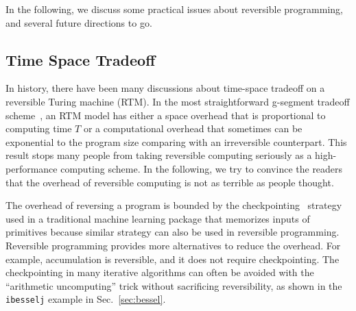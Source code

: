 \documentclass{article}
\newcommand{\<}{\langle}
\renewcommand{\>}{\rangle}
\newcommand{\Sec}[1]{Sec.~\ref{#1}}
\theoremstyle{definition}\newtheorem{definition}{\textit{Definition}}
\begin{document}
In the following, we discuss some practical issues about reversible programming, and several future directions to go.

\subsection{Time Space Tradeoff}\label{sec:timespace}
In history, there have been many discussions about time-space tradeoff on a reversible Turing machine (RTM).
In the most straightforward g-segment tradeoff scheme~\cite{Bennett1989,Levine1990}, an RTM model has either a space overhead that is proportional to computing time $T$ or a computational overhead that sometimes can be exponential to the program size comparing with an irreversible counterpart.
This result stops many people from taking reversible computing seriously as a high-performance computing scheme.
In the following, we try to convince the readers that the overhead of reversible computing is not as terrible as people thought.

The overhead of reversing a program is bounded by the checkpointing~\cite{Chen2016} strategy used in a traditional machine learning package that memorizes inputs of primitives because similar strategy can also be used in reversible programming.~\cite{Perumalla2013}
Reversible programming provides more alternatives to reduce the overhead.
For example, accumulation is reversible, and it does not require checkpointing.
The checkpointing in many iterative algorithms can often be avoided with the ``arithmetic uncomputing'' trick without sacrificing reversibility, as shown in the \texttt{ibesselj} example in \Sec{sec:bessel}.
\end{document}
